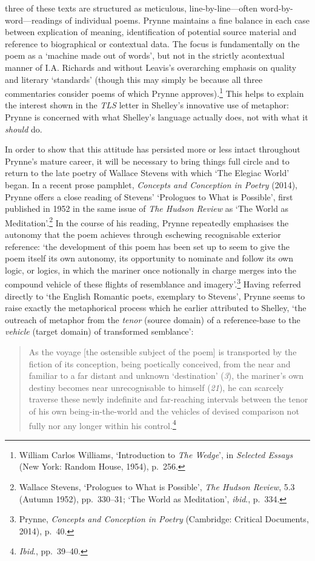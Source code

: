 \documentclass[]{article}
\begin{document}
three of these texts are structured as meticulous, line-by-line—often
word-by-word—readings of individual poems. Prynne maintains a fine
balance in each case between explication of meaning, identification of
potential source material and reference to biographical or contextual
data. The focus is fundamentally on the poem as a ‘machine made out of
words’, but not in the strictly acontextual manner of I.A. Richards and
without Leavis’s overarching emphasis on quality and literary
‘standards’ (though this may simply be because all three commentaries
consider poems of which Prynne approves).\footnote{William Carlos
  Williams, ‘Introduction to \emph{The Wedge}’, in \emph{Selected
  Essays} (New York: Random House, 1954), p.~256.} This helps to explain
the interest shown in the \emph{TLS} letter in Shelley’s innovative use
of metaphor: Prynne is concerned with what Shelley’s language actually
does, not with what it \emph{should} do.

In order to show that this attitude has persisted more or less intact
throughout Prynne’s mature career, it will be necessary to bring things
full circle and to return to the late poetry of Wallace Stevens with
which ‘The Elegiac World’ began. In a recent prose pamphlet,
\emph{Concepts and Conception in Poetry} (2014), Prynne offers a close
reading of Stevens’ ‘Prologues to What is Possible’, first published in
1952 in the same issue of \emph{The Hudson Review} as ‘The World as
Meditation’.\footnote{Wallace Stevens, ‘Prologues to What is Possible’,
  \emph{The Hudson Review}, 5.3 (Autumn 1952), pp.~330–31; ‘The World as
  Meditation’, \emph{ibid}., p.~334.} In the course of his reading,
Prynne repeatedly emphasises the autonomy that the poem achieves through
eschewing recognisable exterior reference: ‘the development of this poem
has been set up to seem to give the poem itself its own autonomy, its
opportunity to nominate and follow its own logic, or logics, in which
the mariner once notionally in charge merges into the compound vehicle
of these flights of resemblance and imagery’.\footnote{Prynne,
  \emph{Concepts and Conception in Poetry} (Cambridge: Critical
  Documents, 2014), p.~40.} Having referred directly to ‘the English
Romantic poets, exemplary to Stevens’, Prynne seems to raise exactly the
metaphorical process which he earlier attributed to Shelley, ‘the
outreach of metaphor from the \emph{tenor} (source domain) of a
reference-base to the \emph{vehicle} (target domain) of transformed
semblance’:

\begin{quote}
\singlespacing As the voyage {[}the ostensible subject of the poem{]} is
transported by the fiction of its conception, being poetically
conceived, from the near and familiar to a far distant and unknown
‘destination’ (\emph{3}), the mariner’s own destiny becomes near
unrecognisable to himself (\emph{21}), he can scarcely traverse these
newly indefinite and far-reaching intervals between the tenor of his own
being-in-the-world and the vehicles of devised comparison not fully nor
any longer within his control.\footnote{\emph{Ibid}., pp.~39–40.}
\end{quote}
\end{document}
